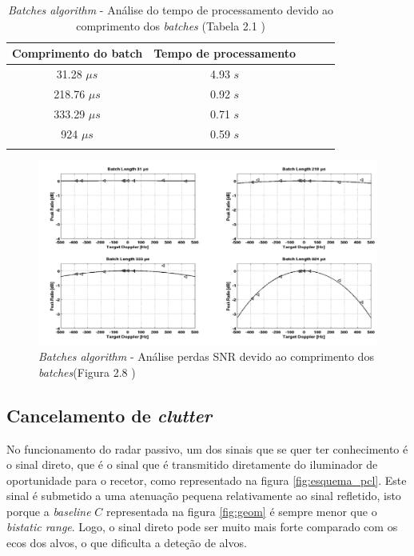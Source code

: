 \begin{table}[h]
\centering
\begin{tabular}{@{}ccccc@{}}
\toprule
Comprimento do batch & Tempo de processamento  \\ \midrule
31.28 $\mu s$        & 4.93 $s$                \\
218.76 $\mu s$       & 0.92 $s$                \\
333.29 $\mu s$       & 0.71 $s$                \\ 
924 $\mu s$          & 0.59 $s$                \\ \bottomrule
\label{tab:Tempo de processamento}
\end{tabular}
\caption[\textit{Batches algorithm} - tempo de processamento]{\textit{Batches algorithm} - Análise do tempo de processamento devido ao comprimento dos \textit{batches} (Tabela 2.1 \cite{Martorella})}
\end{table}

\begin{figure}[h]
\centering
\includegraphics[scale=0.5]{chapters/ch4/assets/bat_snr}
\caption[Perdas SNR]{\textit{Batches algorithm} - Análise perdas \gls{SNR} devido ao comprimento dos \textit{batches}(Figura 2.8 \cite{Martorella})}
\label{fig:bat_snr}
\end{figure}



\subsection{Cancelamento de \textit{clutter}}
No funcionamento do radar passivo, um dos sinais que se quer ter conhecimento é o sinal direto, que é o sinal que é transmitido diretamente do iluminador de oportunidade para o recetor, como representado na figura \ref{fig:esquema_pcl}. Este sinal é submetido a uma atenuação  %
pequena relativamente ao sinal refletido, isto porque a \textit{baseline} $C$ representada na figura \ref{fig:geom} é sempre menor que o \textit{bistatic range}. Logo, o sinal direto pode ser muito mais forte comparado com os ecos dos alvos, o que dificulta a deteção de alvos.\par 


